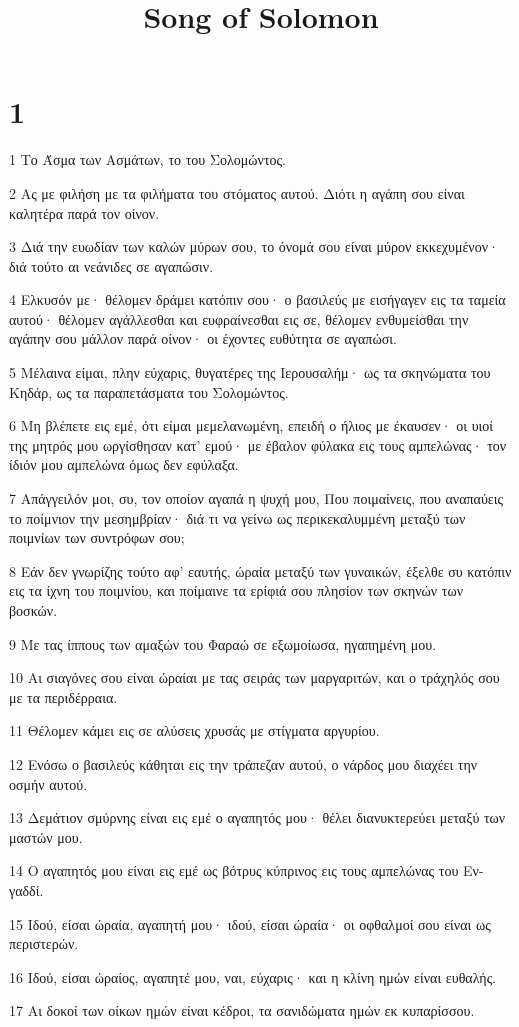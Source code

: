 

\title{Song of Solomon}


\chapter{1}

\par 1 Το Άσμα των Ασμάτων, το του Σολομώντος.
\par 2 Ας με φιλήση με τα φιλήματα του στόματος αυτού. Διότι η αγάπη σου είναι καλητέρα παρά τον οίνον.
\par 3 Διά την ευωδίαν των καλών μύρων σου, το όνομά σου είναι μύρον εκκεχυμένον· διά τούτο αι νεάνιδες σε αγαπώσιν.
\par 4 Ελκυσόν με· θέλομεν δράμει κατόπιν σου· ο βασιλεύς με εισήγαγεν εις τα ταμεία αυτού· θέλομεν αγάλλεσθαι και ευφραίνεσθαι εις σε, θέλομεν ενθυμείσθαι την αγάπην σου μάλλον παρά οίνον· οι έχοντες ευθύτητα σε αγαπώσι.
\par 5 Μέλαινα είμαι, πλην εύχαρις, θυγατέρες της Ιερουσαλήμ· ως τα σκηνώματα του Κηδάρ, ως τα παραπετάσματα του Σολομώντος.
\par 6 Μη βλέπετε εις εμέ, ότι είμαι μεμελανωμένη, επειδή ο ήλιος με έκαυσεν· οι υιοί της μητρός μου ωργίσθησαν κατ' εμού· με έβαλον φύλακα εις τους αμπελώνας· τον ίδιόν μου αμπελώνα όμως δεν εφύλαξα.
\par 7 Απάγγειλόν μοι, συ, τον οποίον αγαπά η ψυχή μου, Που ποιμαίνεις, που αναπαύεις το ποίμνιον την μεσημβρίαν· διά τι να γείνω ως περικεκαλυμμένη μεταξύ των ποιμνίων των συντρόφων σου;
\par 8 Εάν δεν γνωρίζης τούτο αφ' εαυτής, ώραία μεταξύ των γυναικών, έξελθε συ κατόπιν εις τα ίχνη του ποιμνίου, και ποίμαινε τα ερίφιά σου πλησίον των σκηνών των βοσκών.
\par 9 Με τας ίππους των αμαξών του Φαραώ σε εξωμοίωσα, ηγαπημένη μου.
\par 10 Αι σιαγόνες σου είναι ώραίαι με τας σειράς των μαργαριτών, και ο τράχηλός σου με τα περιδέρραια.
\par 11 Θέλομεν κάμει εις σε αλύσεις χρυσάς με στίγματα αργυρίου.
\par 12 Ενόσω ο βασιλεύς κάθηται εις την τράπεζαν αυτού, ο νάρδος μου διαχέει την οσμήν αυτού.
\par 13 Δεμάτιον σμύρνης είναι εις εμέ ο αγαπητός μου· θέλει διανυκτερεύει μεταξύ των μαστών μου.
\par 14 Ο αγαπητός μου είναι εις εμέ ως βότρυς κύπρινος εις τους αμπελώνας του Εν-γαδδί.
\par 15 Ιδού, είσαι ώραία, αγαπητή μου· ιδού, είσαι ώραία· οι οφθαλμοί σου είναι ως περιστερών.
\par 16 Ιδού, είσαι ώραίος, αγαπητέ μου, ναι, εύχαρις· και η κλίνη ημών είναι ευθαλής.
\par 17 Αι δοκοί των οίκων ημών είναι κέδροι, τα σανιδώματα ημών εκ κυπαρίσσου.

